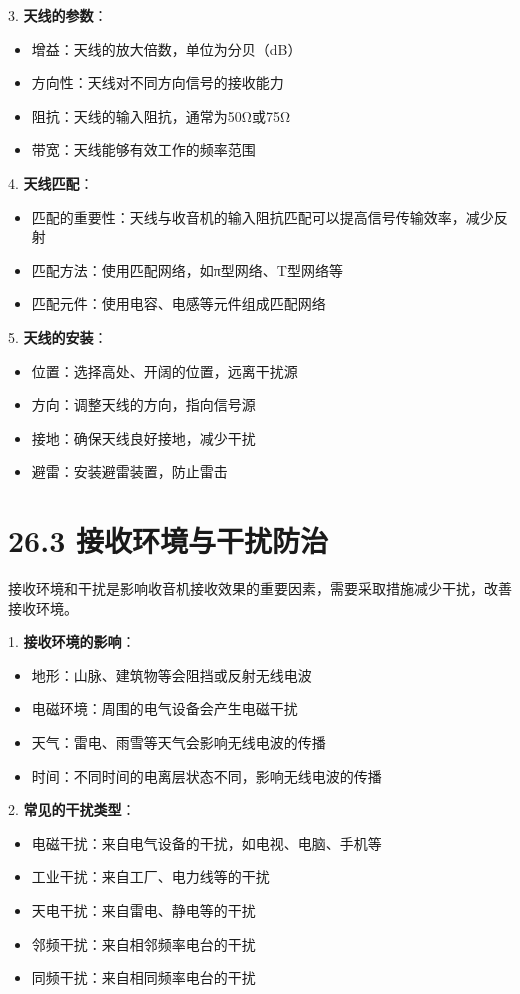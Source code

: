 \documentclass[12pt,UTF8]{ctexbook}
\begin{document}
3. \textbf{天线的参数}：
   \begin{itemize}[leftmargin=3.5em]
   \item 增益：天线的放大倍数，单位为分贝（dB）
   \item 方向性：天线对不同方向信号的接收能力
   \item 阻抗：天线的输入阻抗，通常为50Ω或75Ω
   \item 带宽：天线能够有效工作的频率范围
   \end{itemize}

4. \textbf{天线匹配}：
   \begin{itemize}[leftmargin=3.5em]
   \item 匹配的重要性：天线与收音机的输入阻抗匹配可以提高信号传输效率，减少反射
   \item 匹配方法：使用匹配网络，如π型网络、T型网络等
   \item 匹配元件：使用电容、电感等元件组成匹配网络
   \end{itemize}

5. \textbf{天线的安装}：
   \begin{itemize}[leftmargin=3.5em]
   \item 位置：选择高处、开阔的位置，远离干扰源
   \item 方向：调整天线的方向，指向信号源
   \item 接地：确保天线良好接地，减少干扰
   \item 避雷：安装避雷装置，防止雷击
   \end{itemize}

\section*{26.3 接收环境与干扰防治}

接收环境和干扰是影响收音机接收效果的重要因素，需要采取措施减少干扰，改善接收环境。

1. \textbf{接收环境的影响}：
   \begin{itemize}[leftmargin=3.5em]
   \item 地形：山脉、建筑物等会阻挡或反射无线电波
   \item 电磁环境：周围的电气设备会产生电磁干扰
   \item 天气：雷电、雨雪等天气会影响无线电波的传播
   \item 时间：不同时间的电离层状态不同，影响无线电波的传播
   \end{itemize}

2. \textbf{常见的干扰类型}：
   \begin{itemize}[leftmargin=3.5em]
   \item 电磁干扰：来自电气设备的干扰，如电视、电脑、手机等
   \item 工业干扰：来自工厂、电力线等的干扰
   \item 天电干扰：来自雷电、静电等的干扰
   \item 邻频干扰：来自相邻频率电台的干扰
   \item 同频干扰：来自相同频率电台的干扰
   \end{itemize}
\end{document}
